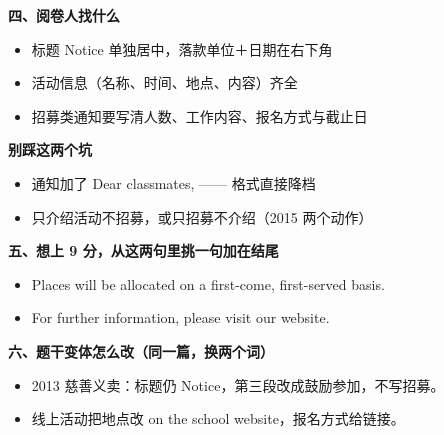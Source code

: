 \documentclass[11pt,a4paper]{ctexart}
\begin{document}
\vspace{5pt}
\noindent\begin{minipage}[t]{0.555\linewidth}
{\color{accent}\bfseries 四、阅卷人找什么}\par
{\footnotesize\begin{itemize}[leftmargin=1.2em,itemsep=1pt,topsep=1pt,parsep=0pt]\setlength{\leftmargin}{1.1em}
\item 标题 Notice 单独居中，落款单位＋日期在右下角
\item 活动信息（名称、时间、地点、内容）齐全
\item 招募类通知要写清人数、工作内容、报名方式与截止日
\end{itemize}}
\end{minipage}\hfill
\begin{minipage}[t]{0.415\linewidth}
{\color{hot}\bfseries 别踩这两个坑}\par
{\footnotesize\begin{itemize}[leftmargin=1.2em,itemsep=1pt,topsep=1pt,parsep=0pt]\setlength{\leftmargin}{1.1em}
\item 通知加了 Dear classmates, —— 格式直接降档
\item 只介绍活动不招募，或只招募不介绍（2015 两个动作）
\end{itemize}}
\end{minipage}\par

\vspace{6pt}
{\color{accent}\bfseries 五、想上 9 分，从这两句里挑一句加在结尾}\par
\vspace{2pt}
{\footnotesize
\begin{itemize}[leftmargin=1.2em,itemsep=1.5pt,topsep=1pt,parsep=0pt]
\item Places will be allocated on a first-come, first-served basis.
\item For further information, please visit our website.
\end{itemize}}\par

\vspace{6pt}
{\color{accent}\bfseries 六、题干变体怎么改（同一篇，换两个词）}\par
\vspace{2pt}
{\footnotesize
\begin{itemize}[leftmargin=1.2em,itemsep=1.5pt,topsep=1pt,parsep=0pt]
\item 2013 慈善义卖：标题仍 Notice，第三段改成鼓励参加，不写招募。
\item 线上活动把地点改 on the school website，报名方式给链接。
\end{itemize}}\par
\end{document}
